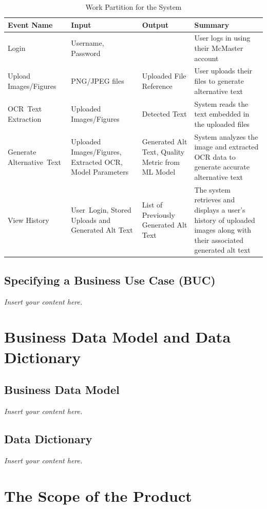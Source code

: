 \documentclass[12pt]{article}
\newcommand{\lips}{\textit{Insert your content here.}}
\begin{document}
\begin{table}[H]
  \centering
  \caption{Work Partition for the System}
  \label{tab:work-partition}
  \begin{tabular}{ |p{3cm}|p{3cm}|p{3cm}|p{4cm}| }
    \hline
    \textbf{Event Name} & \textbf{Input} & \textbf{Output} & \textbf{Summary} \\
    \hline
    Login & Username, Password & & User logs in using their McMaster account \\
    \hline
    Upload  \mbox{Images/Figures} & PNG/JPEG files & Uploaded File Reference & User uploads their files to generate alternative text \\
    \hline
    \mbox{OCR Text} \mbox{Extraction} & Uploaded \mbox{Images/Figures} & Detected Text & System reads the text embedded in the uploaded files \\
    \hline
    Generate \mbox{Alternative Text} & Uploaded  \mbox{Images/Figures}, Extracted OCR, Model Parameters & Generated Alt Text, Quality Metric from ML Model & System analyzes the image and extracted OCR data to generate accurate alternative text \\
    \hline
    View History & \mbox{User Login,} Stored Uploads and Generated Alt Text & List of Previously Generated Alt Text & The system retrieves and displays a user’s history of uploaded images along with their associated generated alt text \\
    \hline
  \end{tabular}
\end{table}


\subsection{Specifying a Business Use Case (BUC)}
\lips

\section{Business Data Model and Data Dictionary}
\subsection{Business Data Model}
\lips
\subsection{Data Dictionary}
\lips

\section{The Scope of the Product}
\end{document}

